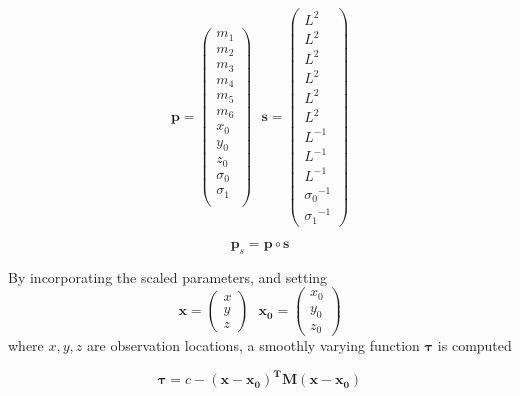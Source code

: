 \documentclass[letterpaper,11pt]{article}
\begin{document}
\begin{equation}
\mathbf{p} =
\begin{pmatrix}
m_1 \\
m_2 \\
m_3 \\
m_4 \\
m_5 \\
m_6 \\
x_0 \\
y_0 \\
z_0 \\
\sigma_0 \\
\sigma_1 \\
\end{pmatrix} \ \ \
\mathbf{s} =
\begin{pmatrix}
{L^2} \\
{L^2} \\
{L^2} \\
{L^2} \\
{L^2} \\
{L^2} \\
{L^{-1}} \\ 
{L^{-1}} \\ 
{L^{-1}} \\ 
{\sigma_0}^{-1} \\
{\sigma_1}^{-1}
\end{pmatrix}
\label{eq:pands}
\end{equation}

\begin{equation}
\mathbf{p}_{s} = \mathbf{p} \circ \mathbf{s}
\label{eq:pscale}
\end{equation}

By incorporating the scaled parameters, and setting 
\begin{equation}
\mathbf{x} = 
\begin{pmatrix}
x \\
y \\
z
\end{pmatrix} \ \ \
\mathbf{x_0} = 
\begin{pmatrix}
x_0 \\
y_0 \\
z_0 
\end{pmatrix}
\end{equation}
where $ x,y,z $ are observation locations, a smoothly varying function $ \boldsymbol{\tau} $ is computed

\begin{equation}
\boldsymbol{\tau} = c - ( \mathbf{x-x_0})^{\mathbf{T}}\mathbf{M}(\mathbf{x-x_0})
\label{eq:tau}
\end{equation}
\end{document}

